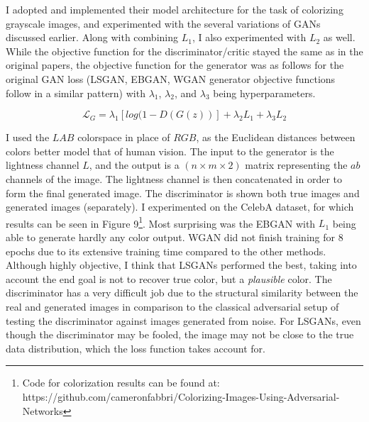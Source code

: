 \documentclass[9pt]{article}
\begin{document}
\noindent I adopted and implemented their model architecture for the task of colorizing grayscale images, and experimented with the several variations of GANs discussed earlier. Along with combining $L_1$, I also
experimented with $L_2$ as well. While the objective function for the discriminator/critic stayed the same as in the original papers, the objective function for the generator was as follows for the original GAN loss (LSGAN,
EBGAN, WGAN generator objective functions follow in a similar pattern) with $\lambda_1$, $\lambda_2$, and $\lambda_3$ being hyperparameters.

\[ \mathcal{L}_G = \lambda_1 [log(1-D(G(z))] + \lambda_2 L_1 + \lambda_3 L_2 \]

\noindent I used the $LAB$ colorspace in place of $RGB$, as the Euclidean distances between colors better model that of human vision. The input to the generator
is the lightness channel $L$,
and the output is a $(n \times m \times 2)$ matrix representing the $ab$ channels of the image. The lightness channel is then concatenated in order to form the final generated image. The discriminator is shown both
true images and generated images (separately). I experimented on the CelebA dataset, for which results can be seen in Figure 9\footnote{Code for colorization results can be found at:
https://github.com/cameronfabbri/Colorizing-Images-Using-Adversarial-Networks}. Most surprising was the EBGAN with $L_1$ being able to generate hardly any color output. 
WGAN did not finish training for 8 epochs due to its extensive training time compared to the other methods.
Although highly objective, I think that LSGANs performed the best, taking into account the end goal is not to recover true color, but a \textit{plausible} color. %
The discriminator has a very difficult job due to the structural similarity between the real and generated images in comparison to the classical adversarial setup of testing the discriminator against images generated from
noise. For LSGANs, even though the discriminator may be fooled, the image may not be close to the true data distribution, which the loss function takes account for. \newline
\end{document}
